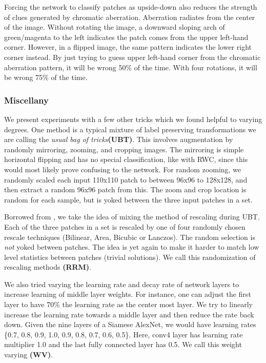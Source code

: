 \documentclass[10pt,twocolumn,letterpaper]{article}
\begin{document}
Forcing the network to classify patches as upside-down also reduces the strength of clues generated by chromatic aberration. Aberration radiates from the center of the image. Without rotating the image, a downward sloping arch of green/magenta to the left indicates the patch comes from the upper left-hand corner. However, in a flipped image, the same pattern indicates the lower right corner instead. By just trying to guess upper left-hand corner from the chromatic aberration pattern, it will be wrong 50\% of the time. With four rotations, it will be wrong 75\% of the time.   

\subsubsection{Miscellany}
  
 We present experiments with a few other tricks which we found helpful to varying degrees. One method is a typical mixture of label preserving transformations \cite{Simard03,Ciresan11,Ciresan12} we are calling the \emph{usual bag of tricks}{\bf (UBT)}. This involves augmentation by randomly mirroring, zooming, and cropping images. The mirroring is simple horizontal flipping and has no special classification, like with RWC, since this would most likely prove confusing to the network. For random zooming, we randomly scaled each input 110x110 patch to between 96x96 to 128x128, and then extract a random 96x96 patch from this. The zoom and crop location is random for each sample, but is yoked between the three input patches in a set.

Borrowed from \cite{Noroozi17}, we take the idea of mixing the method of rescaling during UBT. Each of the three patches in a set is rescaled by one of four randomly chosen rescale techniques (Bilinear, Area, Bicubic or Lanczos). The random selection is \emph{not} yoked between patches. The idea is yet again to make it harder to match low level statistics between patches (trivial solutions). We call this randomization of rescaling methods {\bf (RRM)}. 

We also tried varying the learning rate and decay rate of network layers to increase learning of middle layer weights. For instance, one can adjust the first layer to have 70\% the learning rate as the center most layer. We try to linearly increase the learning rate towards a middle layer and then reduce the rate back down. Given the nine layers of a Siamese AlexNet, we would have learning rates \{0.7, 0.8, 0.9, 1.0, 0.9, 0.8, 0.7, 0.6, 0.5\}. Here, conv4 layer has learning rate multiplier 1.0 and the last fully connected layer has 0.5. We call this weight varying {\bf (WV)}. 
\end{document}
